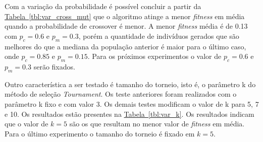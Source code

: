 \documentclass[a4paper]{article}
\begin{document}
Com a variação da probabilidade é possível concluir a partir da
\hyperref[tbl:var_cross_mut]{Tabela~\ref*{tbl:var_cross_mut}} que o algoritmo
atinge a menor \textit{fitness} em média quando a probabilidade de crossover é
menor.  A menor \textit{fitness} média é de 0.13 com $p_c = 0.6$ e $ p_m = 0.3
$, porém a quantidade de indivíduos gerados que são melhores do que a mediana da
população anterior é maior para o último caso, onde $p_c = 0.85$ e $ p_m =
0.15$. Para os próximos experimentos o valor de $p_c = 0.6$ e $ p_m = 0.3$ serão
fixados.

Outro característica a ser testado é tamanho do torneio, isto é, o parâmetro k
do método de seleção \textit{Tournament}. Os teste anteriores foram realizados
com o parâmetro k fixo e com valor 3. Os demais testes modificam o valor de k
para 5, 7 e 10. Os resultados estão presentes na
\hyperref[tbl:var_k]{Tabela~\ref*{tbl:var_k}}. Os resultados indicam que o valor
de $k=5$ são os que resultam no menor valor de \textit{fitness} em média. Para o
último experimento o tamanho do torneio é fixado em $k=5$.
\end{document}
